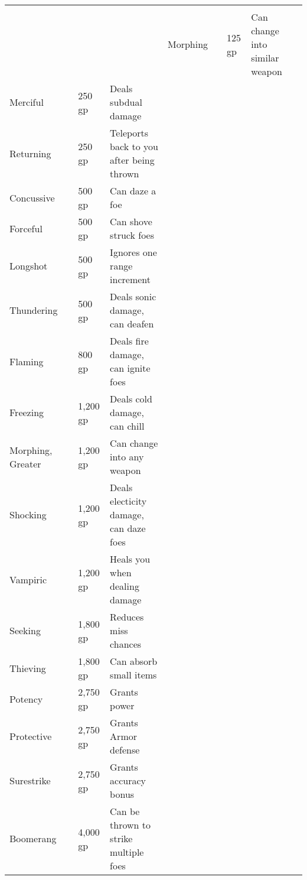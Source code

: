 
\begin{longtabuwrapper}
\begin{longtabu}{l l l X l}
 \\
 &  &  &  &  \tableheaderrule
Morphing &  & 125 gp & Can change into similar weapon & \pageref{item:Morphing} \\
Merciful &  & 250 gp & Deals subdual damage & \pageref{item:Merciful} \\
Returning &  & 250 gp & Teleports back to you after being thrown & \pageref{item:Returning} \\
Concussive &  & 500 gp & Can daze a foe & \pageref{item:Concussive} \\
Forceful &  & 500 gp & Can shove struck foes & \pageref{item:Forceful} \\
Longshot &  & 500 gp & Ignores one range increment & \pageref{item:Longshot} \\
Thundering &  & 500 gp & Deals sonic damage, can deafen & \pageref{item:Thundering} \\
Flaming &  & 800 gp & Deals fire damage, can ignite foes & \pageref{item:Flaming} \\
Freezing &  & 1,200 gp & Deals cold damage, can chill & \pageref{item:Freezing} \\
Morphing, Greater &  & 1,200 gp & Can change into any weapon & \pageref{item:Morphing, Greater} \\
Shocking &  & 1,200 gp & Deals electicity damage, can daze foes & \pageref{item:Shocking} \\
Vampiric &  & 1,200 gp & Heals you when dealing damage & \pageref{item:Vampiric} \\
Seeking &  & 1,800 gp & Reduces miss chances & \pageref{item:Seeking} \\
Thieving &  & 1,800 gp & Can absorb small items & \pageref{item:Thieving} \\
Potency &  & 2,750 gp & Grants  power & \pageref{item:Potency} \\
Protective &  & 2,750 gp & Grants  Armor defense & \pageref{item:Protective} \\
Surestrike &  & 2,750 gp & Grants  accuracy bonus & \pageref{item:Surestrike} \\
Boomerang &  & 4,000 gp & Can be thrown to strike multiple foes & \pageref{item:Boomerang} \\

\end{longtabu}
\end{longtabuwrapper}
